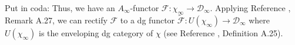 
Put in coda:
Thus, we have an $A_\infty$-functor 
$\mathcal{F}:\chi_\infty \to
\mathcal{D}_\infty$. Applying Reference 
\cite{F}, Remark A.27, we can rectify 
$\mathcal{F}$ to a dg functor 
$\tilde{\mathcal{F}}: U(\chi_\infty) \to 
\mathcal{D}_\infty$ where $U(\chi_\infty)$ 
is the enveloping dg category of $\chi$ 
(see Reference \cite{F}, Definition A.25).